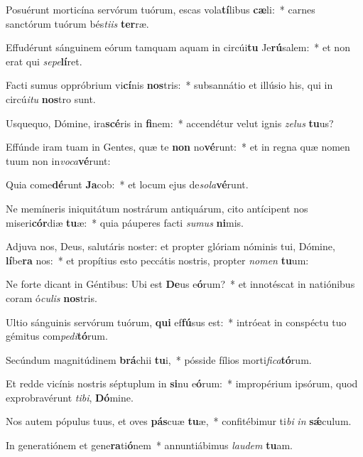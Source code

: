 \item Posuérunt morticína servórum tuórum, escas vola\textbf{tí}libus \textbf{cæ}li:~* carnes sanctórum tuórum bés\textit{ti}\textit{is} \textbf{ter}ræ.
\item Effudérunt sánguinem eórum tamquam aquam in circúi\textbf{tu} Je\textbf{rú}salem:~* et non erat qui \textit{se}\textit{pe}\textbf{lí}ret.
\item Facti sumus oppróbrium vi\textbf{cí}nis \textbf{nos}tris:~* subsannátio et illúsio his, qui in circú\textit{i}\textit{tu} \textbf{nos}tro sunt.
\item Usquequo, Dómine, ira\textbf{scé}ris in \textbf{fi}nem:~* accendétur velut ignis \textit{ze}\textit{lus} \textbf{tu}us?
\item Effúnde iram tuam in Gentes, quæ te \textbf{non} no\textbf{vé}runt:~* et in regna quæ nomen tuum non in\textit{vo}\textit{ca}\textbf{vé}runt:
\item Quia come\textbf{dé}runt \textbf{Ja}cob:~* et locum ejus de\textit{so}\textit{la}\textbf{vé}runt.
\item Ne memíneris iniquitátum nostrárum antiquárum, cito antícipent nos miseri\textbf{cór}diæ \textbf{tu}æ:~* quia páuperes facti \textit{su}\textit{mus} \textbf{ni}mis.
\item Adjuva nos, Deus, salutáris noster: et propter glóriam nóminis tui, Dómine, \textbf{lí}be\textbf{ra} nos:~* et propítius esto peccátis nostris, propter \textit{no}\textit{men} \textbf{tu}um:
\item Ne forte dicant in Géntibus: Ubi est \textbf{De}us e\textbf{ó}rum?~* et innotéscat in natiónibus coram ó\textit{cu}\textit{lis} \textbf{nos}tris.
\item Ultio sánguinis servórum tuórum, \textbf{qui} ef\textbf{fú}sus est:~* intróeat in conspéctu tuo gémitus com\textit{pe}\textit{di}\textbf{tó}rum.
\item Secúndum magnitúdinem \textbf{brá}chii \textbf{tu}i,~* pósside fílios morti\textit{fi}\textit{ca}\textbf{tó}rum.
\item Et redde vicínis nostris séptuplum in \textbf{si}nu e\textbf{ó}rum:~* impropérium ipsórum, quod exprobravérunt \textit{ti}\textit{bi}, \textbf{Dó}mine.
\item Nos autem pópulus tuus, et oves \textbf{pás}cuæ \textbf{tu}æ,~* confitébimur ti\textit{bi} \textit{in} \textbf{sǽ}culum.
\item In generatiónem et gene\textbf{ra}ti\textbf{ó}nem~* annuntiábimus \textit{lau}\textit{dem} \textbf{tu}am.

